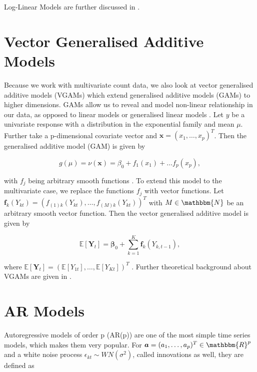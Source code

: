 Log-Linear Models are further discussed in \cite{Fokianos:2011,Woodard:2011,Douc:2013}.


\section{Vector Generalised Additive Models}
\label{sec:Vgam}

Because we work with multivariate count data, we also look at vector generalised additive models (VGAMs) which extend generalised additive models (GAMs) to higher dimensions. GAMs allow us to reveal and model non-linear relationship in our data, as opposed to linear models or generalised linear models \cite{Yee:1996}. Let $y$ be a univariate response with a distribution in the exponential family and mean $\mu$. Further take a p-dimensional covariate vector and $\bm{x}=(x_1,\ldots,x_p)^T$. Then the generalised additive model (GAM) is given by

\begin{equation}
g(\mu) = \nu(\bm{x}) = \beta_0 + f_1(x_1) + \ldots f_p(x_p),
\label{eq:Gam}
\end{equation}

with $f_j$ being arbitrary smooth functions \cite{Yee:1996}.
To extend this model to the multivariate case, we replace the functions $f_j$ with vector functions. Let $\bm{f}_k(Y_{kt}) = (f_{(1)k}(Y_{kt}),\ldots,f_{(M)k}(Y_{kt}))^T$ with $M \in \mathbbm{N}$ be an arbitrary smooth vector function. Then the vector generalised additive model is given by

\begin{equation}
\mathbb{E}[\bm{Y}_t] = \bm{\beta}_0 + \sum_{k=1}^K\bm{f}_k(Y_{k,t-1}),
\label{eq:Vgam}
\end{equation}

where $\mathbb{E}[\bm{Y}_t] = (\mathbb{E}[Y_{1t}],\ldots,\mathbb{E}[Y_{Kt}])^T$ \cite{Yee:1996}. Further theoretical background about VGAMs are given in \cite{Yee:1996,Yee:2015,Wood:2004}.

\section{AR Models}
\label{sec: Ar Models}

Autoregressive models of order p (AR(p))  are one of the most simple time series models, which makes them very popular. For $\bm{a}=(a_1,\ldots,a_p)^T \in \mathbbm{R}^p$ and a white noise process $\epsilon_{kt} \sim WN(\sigma^2)$, called innovations as well, they are defined as 

